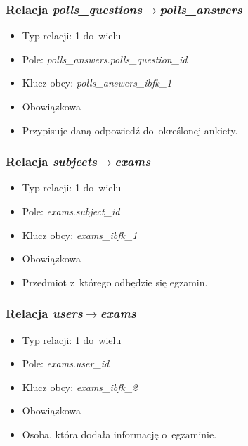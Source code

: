 \documentclass[a4paper,12pt,oneside]{report}
\begin{document}
\subsubsection{Relacja \emph{polls\_questions}$\to$\emph{polls\_answers}}
\label{subsub:polls_questions-polls_answers}
\begin{itemize}
  \item Typ relacji: 1 do~wielu
  \item Pole: \emph{polls\_answers}.\emph{polls\_question\_id}
  \item Klucz obcy: \emph{polls\_answers\_ibfk\_1}
  \item Obowiązkowa
  \item Przypisuje daną odpowiedź do~określonej ankiety.
\end{itemize}

\subsubsection{Relacja \emph{subjects}$\to$\emph{exams}}
\label{subsub:subjects-exams}
\begin{itemize}
  \item Typ relacji: 1 do~wielu
  \item Pole: \emph{exams}.\emph{subject\_id}
  \item Klucz obcy: \emph{exams\_ibfk\_1}
  \item Obowiązkowa
  \item Przedmiot z~którego odbędzie się egzamin.
\end{itemize}

\subsubsection{Relacja \emph{users}$\to$\emph{exams}}
\label{subsub:users-exams}
\begin{itemize}
  \item Typ relacji: 1 do~wielu
  \item Pole: \emph{exams}.\emph{user\_id}
  \item Klucz obcy: \emph{exams\_ibfk\_2}
  \item Obowiązkowa
  \item Osoba, która dodała informację o~egzaminie.
\end{itemize}
\end{document}
